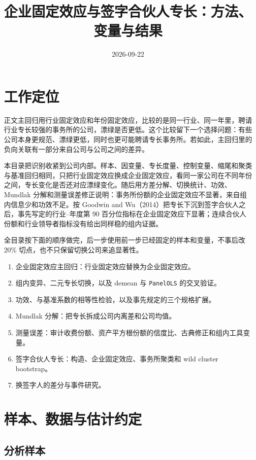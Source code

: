 \documentclass[11pt]{article}
\title{企业固定效应与签字合伙人专长：方法、变量与结果}
\author{}
\date{2026-09-22}
\begin{document}
\maketitle
\tableofcontents

\section{工作定位}

正文主回归用行业固定效应和年份固定效应，比较的是同一行业、同一年里，聘请行业专长较强的事务所的公司，漂绿是否更低。这个比较留下一个选择问题：有些公司本身更规范、漂绿更低，同时也更可能聘请专长事务所。若如此，主回归里的负向关联有一部分来自公司与公司之间的差异。

本目录把识别收紧到公司内部。样本、因变量、专长度量、控制变量、缩尾和聚类与基准回归相同，只把行业固定效应换成企业固定效应，看同一家公司在不同年份之间，专长变化是否还对应漂绿变化。随后用方差分解、切换统计、功效、Mundlak 分解和测量误差修正说明：事务所份额的企业固定效应不显著，来自组内信息少和功效不足。按 Goodwin and Wu（2014）把专长下沉到签字合伙人之后，事先写定的行业--年度第 90 百分位指标在企业固定效应下显著；连续合伙人份额和行业领导者指标没有给出同样稳的组内证据。

全目录按下面的顺序做完，后一步使用前一步已经固定的样本和变量，不事后改 20\% 切点，也不只保留切换公司来追显著性。

\begin{enumerate}
\item 企业固定效应主回归：行业固定效应替换为企业固定效应。
\item 组内变异、二元专长切换，以及 demean 与 \texttt{PanelOLS} 的交叉验证。
\item 功效、与基准系数的相等性检验，以及事先规定的三个规格扩展。
\item Mundlak 分解：把专长拆成公司内离差和公司均值。
\item 测量误差：审计收费份额、资产平方根份额的信度比、古典修正和组内工具变量。
\item 签字合伙人专长：构造、企业固定效应、事务所聚类和 wild cluster bootstrap。
\item 换签字人的差分与事件研究。
\end{enumerate}

\section{样本、数据与估计约定}
\label{sec:sample}

\subsection{分析样本}
\end{document}
